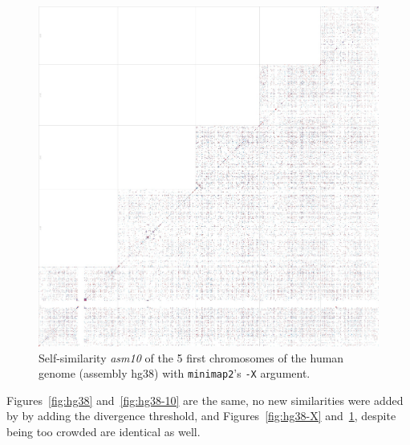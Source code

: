 \documentclass{article}
\begin{document}
\begin{figure}[!h]
	\centering
	\includegraphics[scale=.3]{figs/x_human_10.jpg}
	\caption{Self-similarity \textit{asm10} of the 5 first chromosomes of the human genome (assembly hg38) with \texttt{minimap2}'s \texttt{-X} argument.
	\label{fig:hg38-10-X}}
\end{figure}

Figures~\ref{fig:hg38} and~\ref{fig:hg38-10} are the same, no new similarities were added by by adding the divergence threshold, and
Figures~\ref{fig:hg38-X} and~\ref{fig:hg38-10-X}, despite being too crowded are identical as well.
\end{document}
